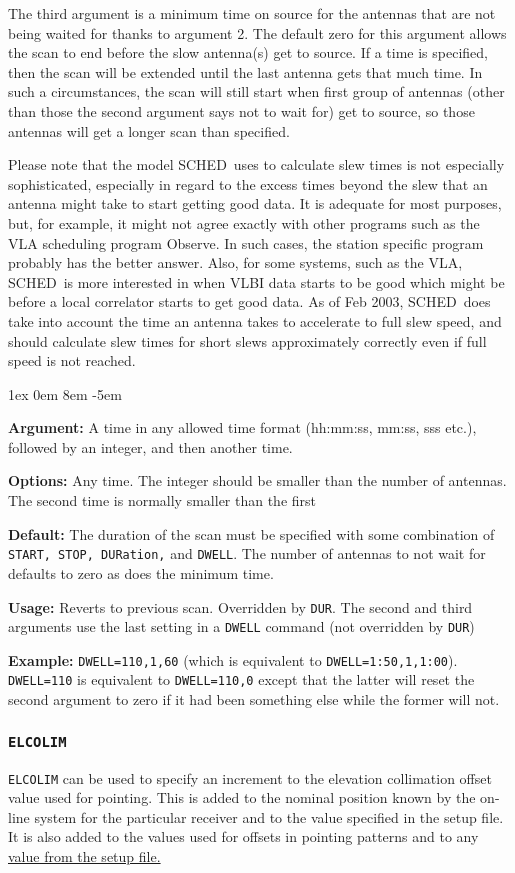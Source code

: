 \documentclass{report}
\newcommand{\schedb}{{\sc SCHED~}}
\newcommand{\rcwbox}[5]{
  \begin{list}{}{\parsep 1ex  \itemsep 0em
                 \leftmargin 8em  \itemindent -5em }
    \item {\bf Argument:} #1
    \item {\bf Options:}  #2
    \item {\bf Default:}  #3
    \item {\bf Usage:}    #4
    \item {\bf Example:}  #5
  \end{list}
}
\begin{document}
The third argument is a minimum time on source for the antennas that
are not being waited for thanks to argument 2.  The default zero for
this argument allows the scan to end before the slow antenna(s) get to
source.  If a time is specified, then the scan will be extended until
the last antenna gets that much time.  In such a circumstances, the
scan will still start when first group of antennas (other than those
the second argument says not to wait for) get to source, so those
antennas will get a longer scan than specified.

Please note that the model \schedb uses to calculate slew times is
not especially sophisticated, especially in regard to the excess
times beyond the slew that an antenna might take to start getting
good data.  It is adequate for most purposes, but, for example, it
might not agree exactly with other programs such as the VLA
scheduling program Observe.  In such cases, the station specific
program probably has the better answer.  Also, for some systems,
such as the VLA, \schedb is more interested in when VLBI data
starts to be good which might be before a local correlator starts
to get good data.  As of Feb 2003, \schedb does take into account
the time an antenna takes to accelerate to full slew speed, and
should calculate slew times for short slews approximately correctly
even if full speed is not reached.

\rcwbox
{A time in any allowed time format (hh:mm:ss, mm:ss, sss etc.), followed
by an integer, and then another time.}
{Any time.  The integer should be smaller than the number of antennas.  The
second time is normally smaller than the first}
{The duration of the scan must be specified with some combination of
{\tt START, STOP, DURation,} and {\tt DWELL}.  The number of antennas to
not wait for defaults to zero as does the minimum time.}
{Reverts to previous scan.  Overridden by {\tt DUR}.  The second and
third arguments use the last setting in a {\tt DWELL} command (not
overridden by {\tt DUR})}
{{\tt DWELL=110,1,60} (which is equivalent to {\tt DWELL=1:50,1,1:00}).
{\tt DWELL=110} is equivalent to {\tt DWELL=110,0} except that the
latter will reset the second argument to zero if it had been something
else while the former will not.}


\subsubsection{\label{MP:ELCOLIM}\tt ELCOLIM}

{\tt ELCOLIM} can be used to specify an
increment to the elevation collimation offset value used for pointing.
This is added to the nominal position known by the on-line system
for the particular receiver and to the value specified in the setup
file.  It is also added to the values used for offsets in pointing
patterns and to any 
{\hyperref[SP:ELCOLIM]{value from the setup file.}}
\end{document}
